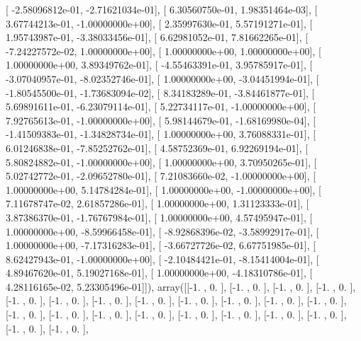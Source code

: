 \documentclass{article}
\begin{document}
       [ -2.58096812e-01,  -2.71621034e-01],
       [  6.30560750e-01,   1.98351464e-03],
       [  3.67744213e-01,  -1.00000000e+00],
       [  2.35997630e-01,   5.57191271e-01],
       [  1.95743987e-01,  -3.38033456e-01],
       [  6.62981052e-01,   7.81662265e-01],
       [ -7.24227572e-02,   1.00000000e+00],
       [  1.00000000e+00,   1.00000000e+00],
       [  1.00000000e+00,   3.89349762e-01],
       [ -4.55463391e-01,   3.95785917e-01],
       [ -3.07040957e-01,  -8.02352746e-01],
       [  1.00000000e+00,  -3.04451994e-01],
       [ -1.80545500e-01,  -1.73683094e-02],
       [  8.34183289e-01,  -3.84461877e-01],
       [  5.69891611e-01,  -6.23079114e-01],
       [  5.22734117e-01,  -1.00000000e+00],
       [  7.92765613e-01,  -1.00000000e+00],
       [  5.98144679e-01,  -1.68169980e-04],
       [ -1.41509383e-01,  -1.34828734e-01],
       [  1.00000000e+00,   3.76088331e-01],
       [  6.01246838e-01,  -7.85252762e-01],
       [  4.58752369e-01,   6.92269194e-01],
       [  5.80824882e-01,  -1.00000000e+00],
       [  1.00000000e+00,   3.70950265e-01],
       [  5.02742772e-01,  -2.09652780e-01],
       [  7.21083660e-02,  -1.00000000e+00],
       [  1.00000000e+00,   5.14784284e-01],
       [  1.00000000e+00,  -1.00000000e+00],
       [  7.11678747e-02,   2.61857286e-01],
       [  1.00000000e+00,   1.31123333e-01],
       [  3.87386370e-01,  -1.76767984e-01],
       [  1.00000000e+00,   4.57495947e-01],
       [  1.00000000e+00,  -8.59966458e-01],
       [ -8.92868396e-02,  -3.58992917e-01],
       [  1.00000000e+00,  -7.17316283e-01],
       [ -3.66727726e-02,   6.67751985e-01],
       [  8.62427943e-01,  -1.00000000e+00],
       [ -2.10484421e-01,  -8.15414004e-01],
       [  4.89467620e-01,   5.19027168e-01],
       [  1.00000000e+00,  -4.18310786e-01],
       [  4.28116165e-02,   5.23305496e-01]]), array([[-1.        ,  0.        ],
       [-1.        ,  0.        ],
       [-1.        ,  0.        ],
       [-1.        ,  0.        ],
       [-1.        ,  0.        ],
       [-1.        ,  0.        ],
       [-1.        ,  0.        ],
       [-1.        ,  0.        ],
       [-1.        ,  0.        ],
       [-1.        ,  0.        ],
       [-1.        ,  0.        ],
       [-1.        ,  0.        ],
       [-1.        ,  0.        ],
       [-1.        ,  0.        ],
       [-1.        ,  0.        ],
       [-1.        ,  0.        ],
       [-1.        ,  0.        ],
       [-1.        ,  0.        ],
       [-1.        ,  0.        ],
       [-1.        ,  0.        ],
       [-1.        ,  0.        ],
       [-1.        ,  0.        ],
\end{document}
